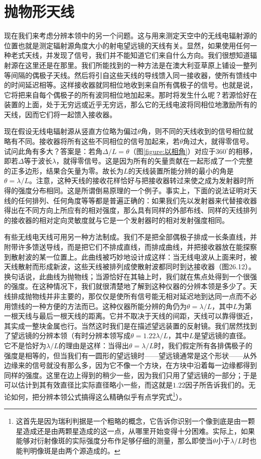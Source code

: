 \section{抛物形天线}

现在我们来考虑分辨本领中的另一个问题。这与用来测定天空中的无线电辐射源的位置也就是测定辐射源角度大小的射电望远镜的天线有关。显然，如果使用任何一种老式天线，并发现了信号，我们并不能知道它们来自什么方向。我们很想知道辐射源在这里还是在那里。我们所能找到的一种方法是在澳大利亚草原上铺设一整列等间隔的偶极子天线。然后将引自这些天线的导线馈入同一接收器，使所有馈线中的时间延迟相等。这样接收器就同相位地收到来自所有偶极子的信号。也就是说，它将把来自每个偶极子的所有波同相位地加起来。那时将发生什么呢？若源恰好在装置的上面，处于无穷远或近乎无穷远，那么它的无线电波将同相位地激励所有的天线，因而它们将一起馈入接收器。

现在假设无线电辐射源从竖直方位略为偏过$\theta$角，则不同的天线收到的信号相位就略有不同。接收器将所有这些不同相位的信号加起来，若$\theta$角过大，就得零信号。试问此角有多大？答案是：若角$\Delta/L=\theta$（图\ref{figure:以相角}）对应于$360^\circ$的相移，即若$\Delta$等于波长$\lambda$，就得零信号。这是因为所有的矢量贡献在一起形成了一个完整的正多边形，结果合矢量为零。故长为$L$的天线装置所能分辨的最小的角是$\theta=\lambda/L$。注意，这种天线的接收花样恰好与把接收器转过来使之成为发射器时所得的强度分布相同。这是所谓倒易原理的一个例子。事实上，下面的说法证明对天线的任何排列、任何角度等等都是普遍正确的：如果我们先以发射器来代替接收器得出在不同方向上所应有的相对强度，那么具有同样的外部布线、同样的天线排列的接收器的相对定向灵敏度就与它是一个发射器时的相对发射强度相同。

有些无线电天线可用另一种方法制成。我们不是把全部偶极子排成一长条直线，并附带许多馈送导线，而是把它们不排成直线，而排成曲线，并把接收器放在能探察到散射波的某一位置上。此曲线被巧妙地设计成这样：当无线电波从上面来时，被天线散射而形成新波，这些天线被排列成使散射波都同时到达接收器（图26.12）。换句话说，此曲线为抛物线；当源恰好在其轴上时，我们就在焦点处得到一个很强的强度。在这种情况下，我们就很清楚地了解到这种仪器的分辨本领是多少了。天线排成抛物线并非主要的，那仅仅是使所有信号能无相对延迟地到达同一点而不必用馈线的一种方便的方法而已。这种仪器所能分辨的角仍为$\theta=\lambda/L$，其中$L$为第一根天线与最后一根天线的距离。它并不取决于天线的间距，天线可以靠得很近，其实成一整块金属也行。当然这时我们是在描述望远装置的反射镜。我们居然找到了望远镜的分辨本领（有时分辨本领写成$\theta=1.22\lambda/L$，其中$L$是望远镜的直径。它不是恰好为$\lambda/L$的理由是这样：当得出$\theta=\lambda/L$时，我们假定所有各排偶极子的强度是相等的，但当我们有一圆形的望远镜时——望远镜通常是这个形状——从外边缘来的信号就没有那么多，因为它不像一个方块，在方块中沿着每一边缘都得到同样的强度。这里在边上得到的稍少一些，因为我们只用了望远镜的一部分；于是可以估计到其有效直径比实际直径略小一些，而这就是$1.22$因子所告诉我们的。无论如何，把分辨本领公式搞得这么精确似乎有点学究式\footnote{这首先是因为瑞利判据是一个粗略的概念，它告诉你识别一个像到底是由一颗星造成还是由两颗星造成的这一点，从哪里开始变得十分困难。实际上，如果能够对衍射像斑的实际强度分布作足够仔细的测量，那么即使当$\theta$小于$\lambda/L$时也能判明像斑是由两个源造成的。}）。

